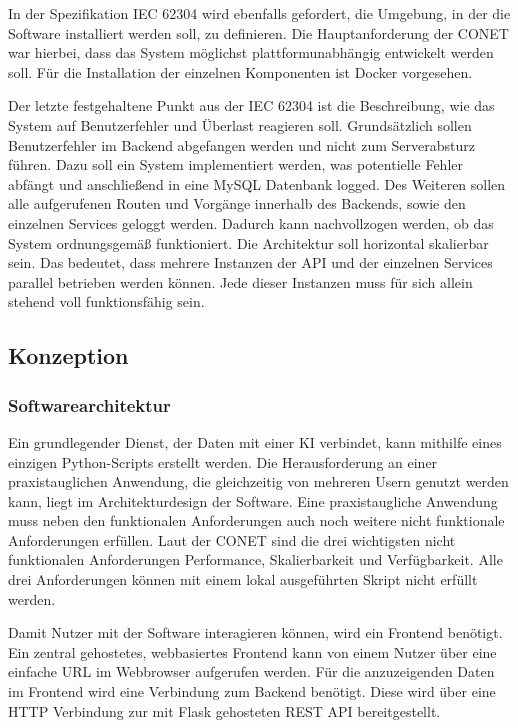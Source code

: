 In der Spezifikation IEC 62304 wird ebenfalls gefordert, die Umgebung, in der die Software installiert werden soll, zu definieren. Die Hauptanforderung der CONET war hierbei, dass das System möglichst plattformunabhängig entwickelt werden soll. Für die Installation der einzelnen Komponenten ist Docker vorgesehen.

Der letzte festgehaltene Punkt aus der IEC 62304 ist die Beschreibung, wie das System auf  Benutzerfehler und Überlast reagieren soll. Grundsätzlich sollen Benutzerfehler im Backend abgefangen werden und nicht zum Serverabsturz führen. Dazu soll ein System implementiert werden, was potentielle Fehler abfängt und anschließend in eine MySQL Datenbank logged. Des Weiteren sollen alle aufgerufenen Routen und Vorgänge innerhalb des Backends, sowie den einzelnen Services geloggt werden. Dadurch kann nachvollzogen werden,  ob das System ordnungsgemäß funktioniert. Die Architektur soll horizontal skalierbar sein. Das bedeutet, dass mehrere Instanzen der API und der einzelnen Services parallel betrieben werden können. Jede dieser Instanzen muss für sich allein stehend voll funktionsfähig sein.

\subsection{Konzeption}
\subsubsection{Softwarearchitektur}
Ein grundlegender Dienst, der Daten mit einer KI verbindet, kann mithilfe eines einzigen Python-Scripts erstellt werden. Die Herausforderung an einer praxistauglichen Anwendung, die gleichzeitig von mehreren Usern genutzt werden kann, liegt im  Architekturdesign der Software. Eine praxistaugliche Anwendung muss neben den funktionalen Anforderungen auch noch weitere nicht funktionale Anforderungen erfüllen. Laut der CONET sind die drei wichtigsten nicht funktionalen Anforderungen Performance, Skalierbarkeit und Verfügbarkeit. Alle drei Anforderungen können mit einem lokal ausgeführten Skript nicht erfüllt werden. 

Damit Nutzer mit der Software interagieren können, wird ein Frontend benötigt. Ein zentral gehostetes, webbasiertes Frontend kann von einem Nutzer über eine einfache URL im Webbrowser aufgerufen werden. Für die anzuzeigenden Daten im Frontend wird eine Verbindung zum Backend benötigt. Diese wird über eine HTTP Verbindung zur mit Flask gehosteten REST API bereitgestellt.

